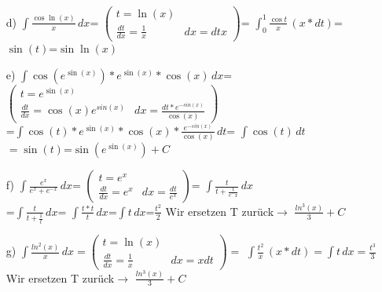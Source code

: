 \documentclass{standalone}
\begin{document}
\begin{itemize}
    \item[d)]
    $\int\frac{\cos{\ln(x)}}{x} \,dx$=
    $\begin{pmatrix}
        t = \ln(x) &  \\
        \frac{dt}{dx} = \frac{1}{x} & dx = dtx
    \end{pmatrix}$= 
    $\int_{0}^{1}\frac{\cos{t}}{x} \,(x*dt)$=
    $\sin(t)$=$\sin\ln(x)$

    \item[e)]
    $\int \cos(e^{\sin(x)})*e^{\sin(x)}*\cos(x)\,dx$=
    $\begin{pmatrix}
        t = e^{\sin(x)} &  \\
        \frac{dt}{dx} = \cos(x)e^{sin(x)} & dx = \frac{dt*e^{-sin(x)}}{\cos(x)}
    \end{pmatrix}$\\
    =$\int \cos(t)*e^{\sin(x)}*\cos(x)*\frac{e^{-sin(x)}}{\cos(x)}\,dt$= 
    $\int \cos(t)\,dt$\\
    $=\sin(t)$=$\sin(e^{\sin(x)})+C$

    \item[f)]
    $\int \frac{e^x}{e^x+e^{-x}}\,dx$=
    $\begin{pmatrix}
        t = e^x &  \\
        \frac{dt}{dx} = e^x & dx = \frac{dt}{e^x}  
    \end{pmatrix}$=
    $\int \frac{t}{t+\frac{1}{e^-x}}\,dx$\\
    =$\int \frac{t}{t+\frac{1}{t}}\,dx$=
    $\int \frac{t*t}{t}\,dx$=$\int t \,dx$=$\frac{t^2}{2}$ Wir ersetzen T zurück$\rightarrow$
    $\frac{ln^3(x)}{3}+C$

    \item[g)]   
    $\int \frac{ln^2(x)}{x}\,dx=
    \begin{pmatrix}
        t = \ln(x) &  \\
        \frac{dt}{dx} = \frac{1}{x} & dx = xdt  
    \end{pmatrix}=$
    $\int \frac{t^2}{x}\,(x*dt)=\int t\,dx=\frac{t^3}{3}$ Wir ersetzen T zurück$\rightarrow$
    $\frac{ln^3(x)}{3}+C$


\end{itemize}
\end{document}
